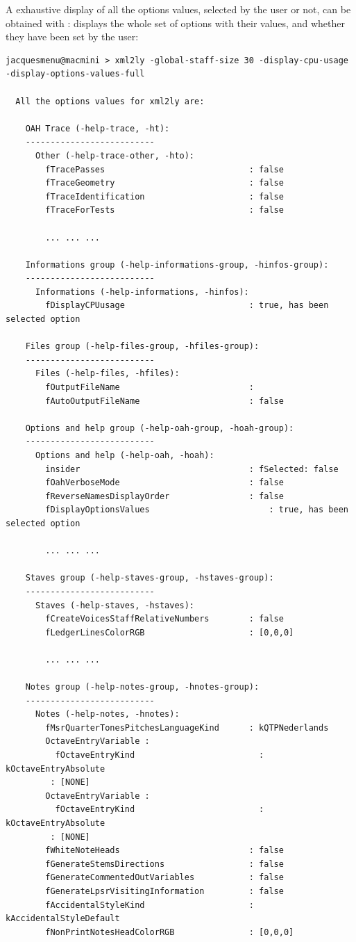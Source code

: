 A exhaustive display of all the options values, selected by the user or not, can be obtained with :
displays the whole set of options with their values, and whether they have been set by the user:
\begin{lstlisting}[language=Terminal]
jacquesmenu@macmini > xml2ly -global-staff-size 30 -display-cpu-usage -display-options-values-full

  All the options values for xml2ly are:

    OAH Trace (-help-trace, -ht):
    --------------------------
      Other (-help-trace-other, -hto):
        fTracePasses                             : false
        fTraceGeometry                           : false
        fTraceIdentification                     : false
        fTraceForTests                           : false

		... ... ...

    Informations group (-help-informations-group, -hinfos-group):
    --------------------------
      Informations (-help-informations, -hinfos):
        fDisplayCPUusage                         : true, has been selected option

    Files group (-help-files-group, -hfiles-group):
    --------------------------
      Files (-help-files, -hfiles):
        fOutputFileName                          :
        fAutoOutputFileName                      : false

    Options and help group (-help-oah-group, -hoah-group):
    --------------------------
      Options and help (-help-oah, -hoah):
        insider                                  : fSelected: false
        fOahVerboseMode                          : false
        fReverseNamesDisplayOrder                : false
        fDisplayOptionsValues                        : true, has been selected option

		... ... ...

    Staves group (-help-staves-group, -hstaves-group):
    --------------------------
      Staves (-help-staves, -hstaves):
        fCreateVoicesStaffRelativeNumbers        : false
        fLedgerLinesColorRGB                     : [0,0,0]

		... ... ...

    Notes group (-help-notes-group, -hnotes-group):
    --------------------------
      Notes (-help-notes, -hnotes):
        fMsrQuarterTonesPitchesLanguageKind      : kQTPNederlands
        OctaveEntryVariable :
          fOctaveEntryKind                         : kOctaveEntryAbsolute
         : [NONE]
        OctaveEntryVariable :
          fOctaveEntryKind                         : kOctaveEntryAbsolute
         : [NONE]
        fWhiteNoteHeads                          : false
        fGenerateStemsDirections                 : false
        fGenerateCommentedOutVariables           : false
        fGenerateLpsrVisitingInformation         : false
        fAccidentalStyleKind                     : kAccidentalStyleDefault
        fNonPrintNotesHeadColorRGB               : [0,0,0]


\end{lstlisting}
